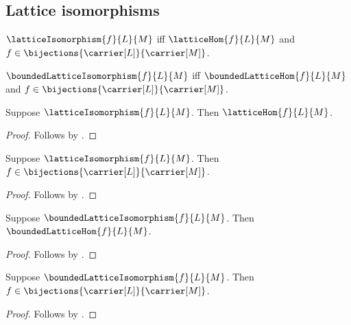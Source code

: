\subsection{Lattice isomorphisms}

\begin{definition}\label{lattice_isomorphism}
    $\latticeIsomorphism{f}{L}{M}$ iff
        $\latticeHom{f}{L}{M}$ and
        $f\in\bijections{\carrier[L]}{\carrier[M]}$.
\end{definition}

\begin{definition}\label{bounded_lattice_isomorphism}
    $\boundedLatticeIsomorphism{f}{L}{M}$ iff
        $\boundedLatticeHom{f}{L}{M}$ and
        $f\in\bijections{\carrier[L]}{\carrier[M]}$.
\end{definition}

\begin{proposition}\label{lattice_isomorphism_is_hom}
    Suppose $\latticeIsomorphism{f}{L}{M}$.
    Then $\latticeHom{f}{L}{M}$.
\end{proposition}
\begin{proof}
    Follows by .
\end{proof}

\begin{proposition}\label{lattice_isomorphism_is_bijection}
    Suppose $\latticeIsomorphism{f}{L}{M}$.
    Then $f\in\bijections{\carrier[L]}{\carrier[M]}$.
\end{proposition}
\begin{proof}
    Follows by .
\end{proof}

\begin{proposition}\label{bounded_lattice_isomorphism_is_hom}
    Suppose $\boundedLatticeIsomorphism{f}{L}{M}$.
    Then $\boundedLatticeHom{f}{L}{M}$.
\end{proposition}
\begin{proof}
    Follows by .
\end{proof}

\begin{proposition}\label{bounded_lattice_isomorphism_is_bijection}
    Suppose $\boundedLatticeIsomorphism{f}{L}{M}$.
    Then $f\in\bijections{\carrier[L]}{\carrier[M]}$.
\end{proposition}
\begin{proof}
    Follows by .
\end{proof}


